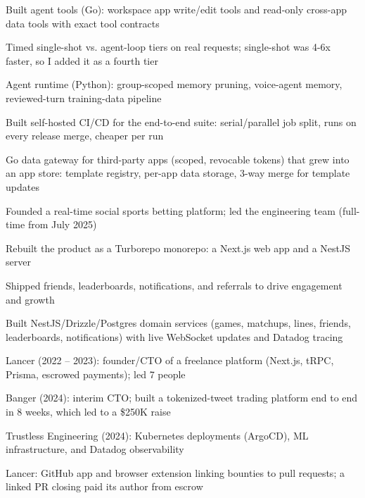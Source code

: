 \documentclass[print]{jack-resume}
\begin{document}
\begin{tightemize}
    \item Built agent tools (Go): workspace app write/edit tools and read-only cross-app data tools with exact tool contracts
    \item Timed single-shot vs. agent-loop tiers on real requests; single-shot was 4-6x faster, so I added it as a fourth tier
    \item Agent runtime (Python): group-scoped memory pruning, voice-agent memory, reviewed-turn training-data pipeline
    \item Built self-hosted CI/CD for the end-to-end suite: serial/parallel job split, runs on every release merge, cheaper per run
    \item Go data gateway for third-party apps (scoped, revocable tokens) that grew into an app store: template registry, per-app data storage, 3-way merge for template updates
\end{tightemize}
\sectionsep

\begin{tightemize}
    \item Founded a real-time social sports betting platform; led the engineering team (full-time from July 2025)
    \item Rebuilt the product as a Turborepo monorepo: a Next.js web app and a NestJS server
    \item Shipped friends, leaderboards, notifications, and referrals to drive engagement and growth
    \item Built NestJS/Drizzle/Postgres domain services (games, matchups, lines, friends, leaderboards, notifications) with live WebSocket updates and Datadog tracing
\end{tightemize}
\sectionsep

\begin{tightemize}
    \item Lancer (2022 -- 2023): founder/CTO of a freelance platform (Next.js, tRPC, Prisma, escrowed payments); led 7 people
    \item Banger (2024): interim CTO; built a tokenized-tweet trading platform end to end in 8 weeks, which led to a \$250K raise
    \item Trustless Engineering (2024): Kubernetes deployments (ArgoCD), ML infrastructure, and Datadog observability
    \item Lancer: GitHub app and browser extension linking bounties to pull requests; a linked PR closing paid its author from escrow
\end{tightemize}
\sectionsep
\end{document}
